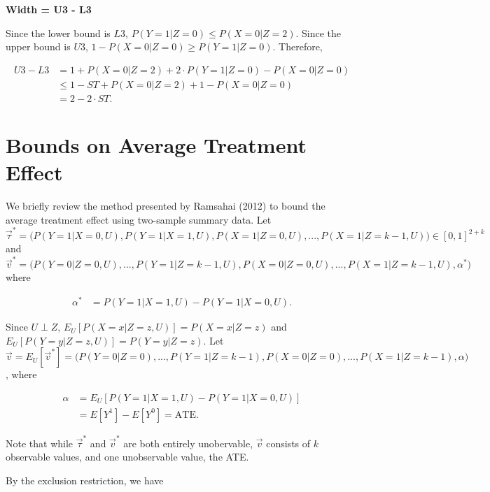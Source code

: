 \documentclass[
]{article}
\theoremstyle{plain}
\begin{document}
\textbf{Width = U3 - L3}

Since the lower bound is \(L3\), \(P(Y = 1 | Z = 0) \le P(X = 0 | Z = 2)\). Since the upper bound is \(U3\), \(1 - P(X = 0 | Z = 0) \ge P(Y = 1 | Z = 0)\). Therefore,

\[\begin{aligned}
U3 - L3 &= 1 + P(X = 0 | Z = 2) + 2\cdot P(Y = 1 | Z = 0) - P(X = 0 | Z = 0) \\
        &\le 1 - ST + P(X = 0 | Z = 2) + 1 - P(X = 0 | Z = 0) \\
        &= 2 - 2\cdot ST.
\end{aligned}\]

\newpage

\hypertarget{bounds-on-average-treatment-effect}{%
\section{Bounds on Average Treatment Effect}\label{bounds-on-average-treatment-effect}}

We briefly review the method presented by Ramsahai (2012) to bound the average treatment effect using two-sample summary data. Let \(\vec{\tau}^* = \Big(P(Y = 1 | X = 0, U), P(Y = 1 | X = 1, U), P(X = 1 | Z = 0, U), ..., P(X = 1 | Z = k-1, U)\Big) \in [0,1]^{2+k}\) and \(\vec{v}^* = \Big(P(Y = 0 | Z = 0, U), ..., P(Y = 1 | Z = k-1, U), P(X = 0 | Z = 0, U), ..., P(X = 1 | Z = k-1, U), \alpha^*\Big)\) where

\[
\begin{aligned}
\alpha^* &= P(Y = 1 | X = 1, U) - P(Y = 1 | X = 0, U).
\end{aligned}
\]

Since \(U \perp Z\), \(E_U[P(X = x | Z = z, U)] = P(X = x | Z = z)\) and \(E_U[P(Y = y | Z = z, U)] = P(Y = y | Z = z)\). Let \(\vec{v} = E_U[\vec{v}^*] = \Big(P(Y = 0 | Z = 0), ..., P(Y = 1 | Z = k-1), P(X = 0 | Z = 0), ..., P(X = 1 | Z = k-1), \alpha \Big)\), where

\[
\begin{aligned}
\alpha &= E_U[P(Y = 1 | X = 1, U) - P(Y = 1 | X = 0, U)] \\
       &= E[Y^1] - E[Y^0] = \text{ATE}.
\end{aligned}
\]

Note that while \(\vec{\tau}^*\) and \(\vec{v}^*\) are both entirely unobervable, \(\vec{v}\) consists of \(k\) observable values, and one unobservable value, the ATE.

By the exclusion restriction, we have
\end{document}
